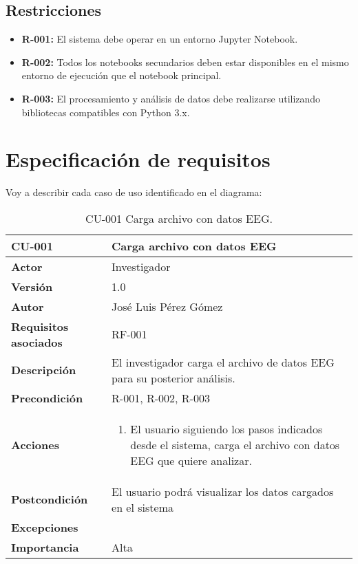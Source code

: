 \subsection{Restricciones}

\begin{itemize}
\tightlist
\item
  \textbf{R-001:} El sistema debe operar en un entorno Jupyter Notebook.
 
\item
  \textbf{R-002:} Todos los notebooks secundarios deben estar disponibles en el mismo entorno de ejecución que el notebook principal.

\item
  \textbf{R-003:} El procesamiento y análisis de datos debe realizarse utilizando bibliotecas compatibles con Python 3.x.

\end{itemize}




\section{Especificación de requisitos}

Voy a describir cada caso de uso identificado en el diagrama:


\begin{table}[p]
	\centering
	\begin{tabularx}{\linewidth}{ p{} p{} }
		\toprule
		\textbf{CU-001}    & \textbf{Carga archivo con datos EEG}\\
		\toprule		
		\textbf{Actor}              & Investigador    \\ 
		\textbf{Versión}              & 1.0    \\
		\textbf{Autor}                & José Luis Pérez Gómez \\
		\textbf{Requisitos asociados} & RF-001 \\
		\textbf{Descripción}          & El investigador carga el archivo de datos EEG para su posterior análisis. \\
		\textbf{Precondición}         & R-001, R-002, R-003\\
		\textbf{Acciones}             &
		\begin{enumerate}
			\def\labelenumi{\arabic{enumi}.}
			\tightlist
			\item El usuario siguiendo los pasos indicados desde el sistema, carga el archivo con datos EEG que quiere analizar.

		\end{enumerate}\\
		\textbf{Postcondición}        & El usuario podrá visualizar los datos cargados en el sistema\\
		\textbf{Excepciones}          &  \\
		\textbf{Importancia}          & Alta \\
		\bottomrule
	\end{tabularx}
	\caption{CU-001 Carga archivo con datos EEG.}
\end{table}



